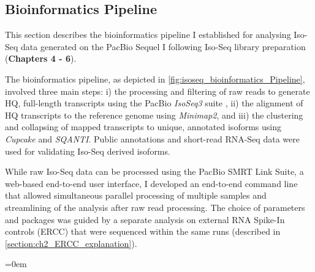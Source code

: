 \clearpage
\subsection{Bioinformatics Pipeline} 
\label{section:isoseq_bioinformatics}
This section describes the bioinformatics pipeline I established for analysing Iso-Seq data generated on the PacBio Sequel I following Iso-Seq library preparation (\textbf{Chapters 4 - 6}). 

The bioinformatics pipeline, as depicted in \cref{fig:isoseq_bioinformatics_Pipeline}, involved three main steps: i) the processing and filtering of raw reads to generate HQ, full-length transcripts using the PacBio \textit{IsoSeq3} suite \cite{Gordon2015}, ii) the alignment of HQ transcripts to the reference genome using \textit{Minimap2}\cite{Li2018}, and iii) the clustering and collapsing of mapped transcripts to unique, annotated isoforms using \textit{Cupcake}\cite{TsengCupcake} and \textit{SQANTI}\cite{Tardaguila2018}. Public annotations and short-read RNA-Seq data were used for validating Iso-Seq derived isoforms. 

While raw Iso-Seq data can be processed using the PacBio SMRT Link Suite, a web-based end-to-end user interface, I developed an end-to-end command line that allowed simultaneous parallel processing of multiple samples and streamlining of the analysis after raw read processing. The choice of parameters and packages was guided by a separate analysis on external RNA Spike-In controls (ERCC) that were sequenced within the same runs (described in \cref{section:ch2_ERCC_explanation}). 

\begingroup
\parindent=0em
\localtableofcontents 
\endgroup


